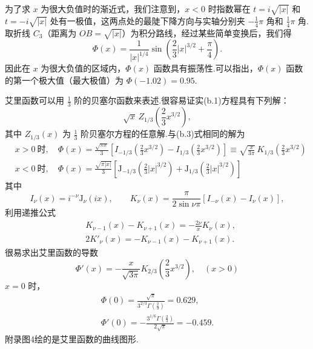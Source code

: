 为了求 $x$ 为很大负值时的渐近式，我们注意到，$x<0$ 时指数幂在 $t=i\sqrt{|x|}$ 和 $t=-i\sqrt{|x|}$ 处有一极值，这两点处的最陡下降方向与实轴分别夹 $-\frac{1}{4}\pi$ 角和 $\frac{1}{4}\pi$ 角.取折线 $C_3$（距离为 $OB=\sqrt{|x|}$）为积分路线，经过某些简单变换后，我们得
\begin{equation}
  \varPhi(x)=\frac{1}{|x|^{1/4}}\sin\left(\frac{2}{3}|x|^{3/2}+\frac{\pi}{4}\right).
\end{equation}
因此在 $x$ 为很大负值的区域内，$\varPhi(x)$ 函数具有振荡性.可以指出，$\varPhi(x)$ 函数的第一个极大值（最大极值）为 $\varPhi(-1.02)=0.95$.

艾里函数可以用 $\frac{1}{3}$ 阶的贝塞尔函数来表述.很容易证实(b.1)方程具有下列解：
\begin{equation*}
  \sqrt{x}\,Z_{1/3}\left(\frac{2}{3}x^{3/2}\right),
\end{equation*}
其中 $Z_{1/3}(x)$ 为 $\frac{1}{3}$ 阶贝塞尔方程的任意解.与(b.3)式相同的解为
\begin{equation}
\begin{aligned}
  &x>0\ \text{时},\quad
  \varPhi(x)=\frac{\sqrt{\pi x}}{3}\left[I_{-1/3}\left(\frac{2}{3}x^{3/2}\right)
  -I_{1/3}\left(\frac{2}{3}x^{3/2}\right)\right]
  \equiv\sqrt{\frac{x}{3\pi}}\,K_{1/3}\left(\frac{2}{3}x^{3/2}\right)\\
  &x<0\ \text{时},\quad
  \varPhi(x)=\frac{\sqrt{\pi|x|}}{3}\left[\mathrm{J}_{-1/3}\left(\frac{2}{3}|x|^{3/2}\right)
  +\mathrm{J}_{1/3}\left(\frac{2}{3}|x|^{3/2}\right)\right]
\end{aligned}
\end{equation}
其中
\begin{equation*}
  I_\nu(x)=i^{-\nu}\mathrm{J}_\nu(ix),\qquad
  K_\nu(x)=\frac{\pi}{2\sin\nu\pi}\left[I_{-\nu}(x)-I_\nu(x)\right],
\end{equation*}
利用递推公式
\begin{equation*}
\begin{aligned}
  &K_{\nu-1}(x)-K_{\nu+1}(x)=-\frac{2\nu}{x}K_\nu(x),\\
  &2K'_\nu(x)=-K_{\nu-1}(x)-K_{\nu+1}(x).
\end{aligned}
\end{equation*}
很易求出艾里函数的导数
\begin{equation}
  \varPhi'(x)=-\frac{x}{\sqrt{3\pi}}K_{2/3}\left(\frac{2}{3}x^{3/2}\right),\quad(x>0)
\end{equation}
$x=0$ 时，
\begin{equation*}
\begin{gathered}
  \varPhi(0)=\frac{\sqrt{\pi}}{3^{2/3}\Gamma\left(\frac{2}{3}\right)}=0.629,\\
  \varPhi'(0)=-\frac{3^{1/6}\Gamma\left(\frac{2}{3}\right)}{2\sqrt{\pi}}=-0.459.
\end{gathered}
\end{equation*}
附录图4绘的是艾里函数的曲线图形.

